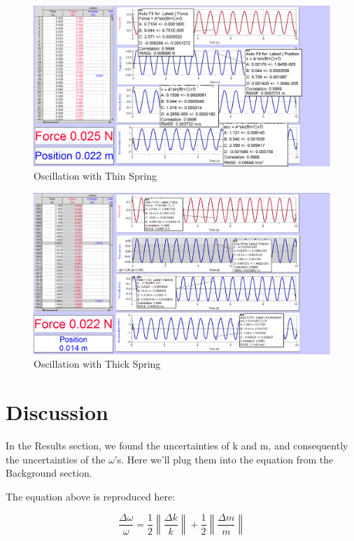 \documentclass[]{article}
\begin{document}
\begin{figure}[H]
	\centering
	\includegraphics[width=\textwidth]{res/p2_400g}
	\caption{Oscillation with Thin Spring}
	\label{fig:Oscillation with Thin Spring}
\end{figure}

\begin{figure}[H]
	\centering
	\includegraphics[width=\textwidth]{res/p2_thinSpring}
	\caption{Oscillation with Thick Spring}
	\label{fig:Oscillation with Thick Spring}
\end{figure}


\section{Discussion}

In the Results section, we found the uncertainties of k and m, and consequently the uncertainties of the $ \omega $'s. Here we'll plug them into the equation from the Background section.

The equation above is reproduced here:

\begin{equation}\label{uncertainty}
\frac{\Delta \omega}{\omega} = \frac{1}{2} \left\| \frac{\Delta k}{k} \right\|+ \frac{1}{2} \left\|\frac{\Delta m}{m} \right\|
\end{equation}
\end{document}
